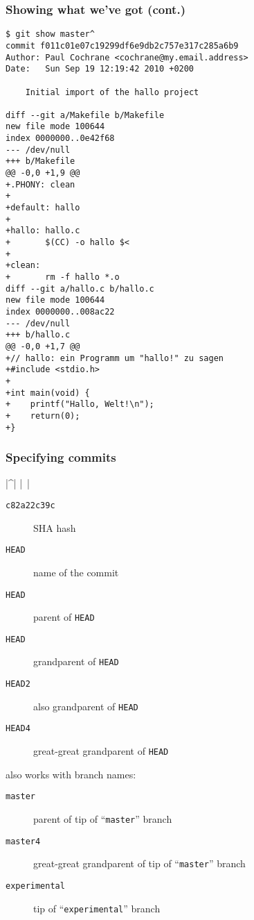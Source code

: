 \begin{frame}[fragile]
\frametitle{Showing what we've got (cont.)}

\begin{multicols}{2}
\begin{lstlisting}[basicstyle=\tiny\ttfamily\color{black}]
$ git show master^
commit f011c01e07c19299df6e9db2c757e317c285a6b9
Author: Paul Cochrane <cochrane@my.email.address>
Date:   Sun Sep 19 12:19:42 2010 +0200

    Initial import of the hallo project

diff --git a/Makefile b/Makefile
new file mode 100644
index 0000000..0e42f68
--- /dev/null
+++ b/Makefile
@@ -0,0 +1,9 @@
+.PHONY: clean
+
+default: hallo
+
+hallo: hallo.c
+       $(CC) -o hallo $<
+
+clean:
+       rm -f hallo *.o
diff --git a/hallo.c b/hallo.c
new file mode 100644
index 0000000..008ac22
--- /dev/null
+++ b/hallo.c
@@ -0,0 +1,7 @@
+// hallo: ein Programm um "hallo!" zu sagen
+#include <stdio.h>
+
+int main(void) {
+    printf("Hallo, Welt!\n");
+    return(0);
+}
\end{lstlisting}
\end{multicols}

\end{frame}


\begin{frame}[fragile]
    \frametitle{Specifying commits}

    |^|
    |~|
    \begin{description}
	\item[\Verb|c82a22c39c|] SHA hash
	\item[\Verb|HEAD|] name of the commit
	\item[\Verb|HEAD|] parent of \Verb|HEAD|
	\item[\Verb|HEAD|]
	    grandparent of \Verb|HEAD|
	\item[\Verb|HEAD|\Verb|2|]
	    also grandparent of \Verb|HEAD|
	\item[\Verb|HEAD|\Verb|4|]
	    great-great grandparent of \Verb|HEAD|
    \end{description}

    also works with branch names:

    \begin{description}
	\item[\Verb|master|]
	    parent of tip of ``\Verb|master|'' branch
	\item[\Verb|master|\Verb|4|]
	    great-great grandparent of tip of ``\Verb|master|'' branch
	\item[\Verb|experimental|] tip of ``\Verb|experimental|'' branch
    \end{description}
\end{frame}


